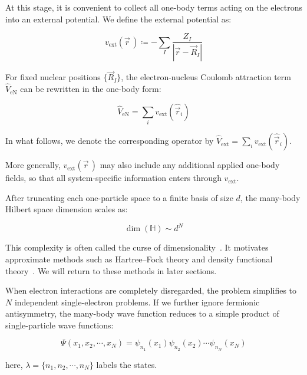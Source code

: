 At this stage, it is convenient to collect all one-body terms acting on the electrons into an external potential.
We define the external potential as:

\begin{equation}
    v_\mathrm{ext}(\vec{r}\,)\coloneqq -\sum_{I}\frac{Z_I}{|\vec{r}-\vec{R}_I|}
\label{one-body_Electron-nucleus}
\end{equation}

For fixed nuclear positions $\{\vec{R}_I\}$, the electron-nucleus Coulomb attraction term $\hat{V}_\mathrm{eN}$ can be rewritten in the one-body form:

\begin{equation}
    \hat{V}_\mathrm{eN}=\sum_i v_\mathrm{ext}(\hat{\vec{r}}_i)
\label{Electron-nucleus_one-body_form}
\end{equation}

In what follows, we denote the corresponding operator by $\hat{V}_\mathrm{ext}=\sum_i v_\mathrm{ext}(\hat{\vec{r}}_i)$.

More generally, $v_\mathrm{ext}(\vec{r}\,)$ may also include any additional applied one-body fields, so that all system-specific information enters through $v_\mathrm{ext}$.

After truncating each one-particle space to a finite basis of size $d$, the many-body Hilbert space dimension scales as:

\begin{equation}
    \dim(\mathbb{H})\sim d^{N}
\label{exponential_growth}
\end{equation}

This complexity is often called the curse of dimensionality~\cite{alhambra2023quantum}.
It motivates approximate methods such as Hartree--Fock theory and density functional theory~\cite{pribram2015dft,jones2015density}.
We will return to these methods in later sections.

When electron interactions are completely disregarded, the problem simplifies to $N$ independent single-electron problems.
If we further ignore fermionic antisymmetry, the many-body wave function reduces to a simple product of single-particle wave functions:

\begin{equation}
    \Psi(x_1,x_2,\cdots,x_N)=\psi_{n_1}(x_1)\psi_{n_2}(x_2)\cdots\psi_{n_N}(x_N)
\label{independent_body_function}
\end{equation}

here, $\lambda=\{n_1,n_2,\cdots,n_N\}$ labels the states.

